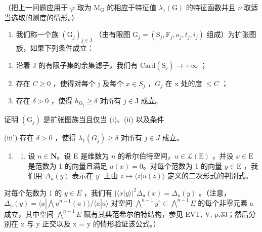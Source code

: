 （把上一问题应用于 \(\varphi\) 取为 \(\mathrm{M_G}\) 的相应于特征值 \(\lambda_1(\mathrm{G})\) 的特征函数并且 \(\nu\) 取适当选取的测度的情形。）

\begin{enumerate}
\def\labelenumi{\alph{enumi})}
\setcounter{enumi}{4}
\tightlist
\item
  我们称一个族 \((\mathrm{G}_{j})_{j\in\mathrm{J}}\) （由有限图 \(\mathrm{G}_{j}=(\mathrm{S}_{j},\mathrm{F}_{j},o_{j},t_{j},i_{j})\) 组成）为扩张图族，如果下列条件成立：
\end{enumerate}

\begin{enumerate}
\def\labelenumi{(\roman{enumi})}
\item
  沿着 J 的有限子集的余集滤子，我们有 \(\mathrm{Card}(\mathrm{S}_{j}) \to +\infty\) ；
\item
  存在 \(C \geqslant 0\) ，使得对每个 j 及每个 \(x \in S_{j}\) ，\(G_{j}\) 在 x 处的度 \(\leqslant C\) ；
\item
  存在 \(\delta > 0\) ，使得 \(h_{\mathrm{G}_j} \geqslant \delta\) 对所有 \(j \in \mathrm{J}\) 成立。
\end{enumerate}

证明 \((\mathrm{G}_{j})\) 是扩张图族当且仅当 (i)、(ii) 以及条件

(iii') 存在 \(\delta > 0\) ，使得 \(\lambda_1(G_j) \geqslant \delta\) 对所有 \(j \in J\) 成立。

\begin{enumerate}
\def\labelenumi{\arabic{enumi})}
\setcounter{enumi}{16}
\tightlist
\item
  \begin{enumerate}
  \def\labelenumii{\alph{enumii})}
  \tightlist
  \item
    设 \(n \in \mathbf{N}\)。设 E 是维数为 \(n\) 的希尔伯特空间，\(u \in \mathcal{L}(\mathrm{E})\) ，并设 \(x \in \mathrm{E}\) 是范数为 1 的向量且满足 \(u(x) = 0\)。对每个范数为 1 的向量 \(y \in \mathrm{E}\) ，我们用 \(\Delta_u(y)\) 表示在 \(y^\circ\) 上由 \(z \mapsto \langle z | u(z) \rangle\) 定义的二次形式的判别式。
  \end{enumerate}
\end{enumerate}

对每个范数为 1 的 \(y \in E\) ，我们有 \(|\langle x | y \rangle|^{2} \Delta_{u}(x) = \Delta_{u}(y)\) 。（注意，\(\Delta_{u}(y) = \langle a | \bigwedge u^{n-1}(a) \rangle / \langle a | a \rangle\) 对空间 \(\bigwedge^{n-1} y^{\circ} \subset \bigwedge^{n-1} E\) 的每个非零元素 a 成立，其中空间 \(\bigwedge^{n-1} E\) 赋有其典范希尔伯特结构，参见 EVT, V, p.33；然后分别在 x 与 y 正交以及 x = y 的情形验证该公式。）

